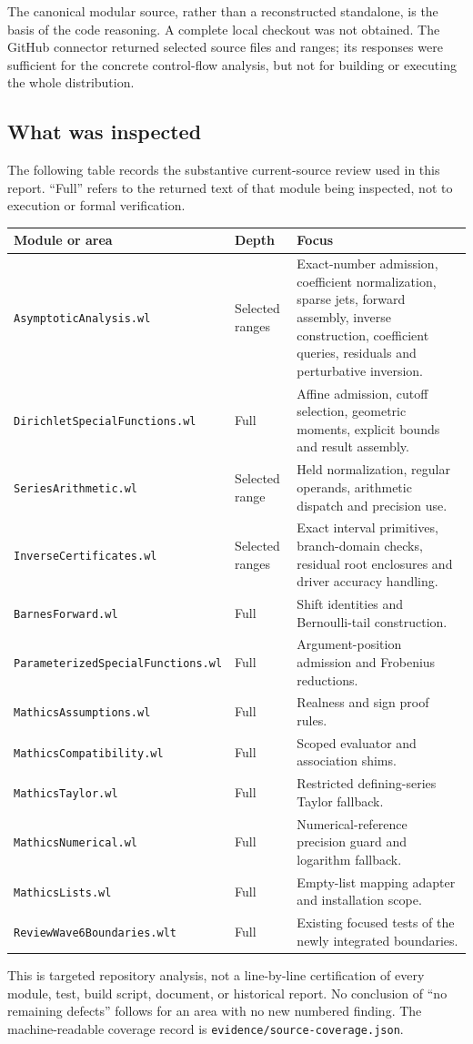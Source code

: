 \documentclass[11pt,letterpaper]{article}
\newcommand{\code}[1]{\nolinkurl{#1}}
\begin{document}
The canonical modular source, rather than a reconstructed standalone, is the
basis of the code reasoning. A complete local checkout was not obtained.
The GitHub connector returned selected source files and ranges; its responses
were sufficient for the concrete control-flow analysis, but not for building
or executing the whole distribution.

\subsection{What was inspected}
The following table records the substantive current-source review used in this
report. ``Full'' refers to the returned text of that module being inspected,
not to execution or formal verification.
\begin{longtable}{@{}P{0.38\textwidth}P{0.16\textwidth}P{0.39\textwidth}@{}}
\toprule Module or area & Depth & Focus \\\midrule\endhead
\code{AsymptoticAnalysis.wl} & Selected ranges & Exact-number admission, coefficient normalization, sparse jets, forward assembly, inverse construction, coefficient queries, residuals and perturbative inversion.\\
\code{DirichletSpecialFunctions.wl} & Full & Affine admission, cutoff selection, geometric moments, explicit bounds and result assembly.\\
\code{SeriesArithmetic.wl} & Selected range & Held normalization, regular operands, arithmetic dispatch and precision use.\\
\code{InverseCertificates.wl} & Selected ranges & Exact interval primitives, branch-domain checks, residual root enclosures and driver accuracy handling.\\
\code{BarnesForward.wl} & Full & Shift identities and Bernoulli-tail construction.\\
\code{ParameterizedSpecialFunctions.wl} & Full & Argument-position admission and Frobenius reductions.\\
\code{MathicsAssumptions.wl} & Full & Realness and sign proof rules.\\
\code{MathicsCompatibility.wl} & Full & Scoped evaluator and association shims.\\
\code{MathicsTaylor.wl} & Full & Restricted defining-series Taylor fallback.\\
\code{MathicsNumerical.wl} & Full & Numerical-reference precision guard and logarithm fallback.\\
\code{MathicsLists.wl} & Full & Empty-list mapping adapter and installation scope.\\
\code{ReviewWave6Boundaries.wlt} & Full & Existing focused tests of the newly integrated boundaries.\\
\bottomrule
\end{longtable}
This is targeted repository analysis, not a line-by-line certification of every
module, test, build script, document, or historical report. No conclusion of
``no remaining defects'' follows for an area with no new numbered finding.
The machine-readable coverage record is \code{evidence/source-coverage.json}.
\end{document}
